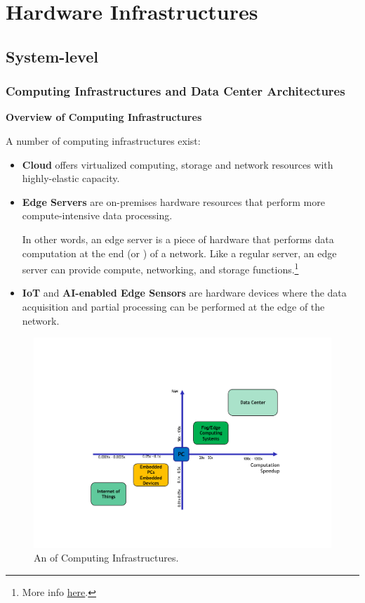 \section{Hardware Infrastructures}

\subsection{System-level}

\subsubsection{Computing Infrastructures and Data Center Architectures}

\begin{center}
    \textcolor{Red2}{\textbf{Overview of Computing Infrastructures}}
\end{center}

\noindent
A number of computing infrastructures exist:
\begin{itemize}
    \item \textbf{Cloud} offers virtualized computing, storage and network resources with highly-elastic capacity.
    
    
    \item \textbf{Edge Servers} are on-premises hardware resources that perform more compute-intensive data processing.
    
    In other words, an edge server is a piece of hardware that performs data computation at the end (or ) of a network. Like a regular server, an edge server can provide compute, networking, and storage functions.\footnote{More info \href{https://phoenixnap.com/blog/edge-server}{here}.}

    
    \item \textbf{IoT} and \textbf{AI-enabled Edge Sensors} are hardware devices where the data acquisition and partial processing can be performed at the edge of the network.
\end{itemize}

\begin{figure}[!htp]
    \centering
    \includegraphics[width=\textwidth]{img/example-computing-infrastructure-1.pdf}
    \caption{An  of Computing Infrastructures.\cite{computing-infrastructures-slides}}
\end{figure}

